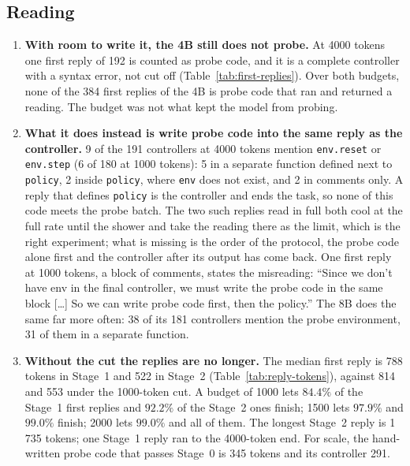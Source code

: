 \documentclass[11pt,a4paper]{article}
\begin{document}
\begin{table}[h]
\centering\small
\resizebox{\linewidth}{!}{}
\caption{By third of the limit's range, for the 4B at both budgets.}
\label{tab:budget-by-third}
\end{table}

\subsection{Reading}

\begin{enumerate}[leftmargin=1.5em]
  \item \textbf{With room to write it, the 4B still does not probe.} At 4000
  tokens one first reply of 192 is counted as probe code, and it is a complete
  controller with a syntax error, not cut off
  (Table~\ref{tab:first-replies}). Over both budgets, none of the 384 first
  replies of the 4B is probe code that ran and returned a reading. The budget
  was not what kept the model from probing.

  \item \textbf{What it does instead is write probe code into the same reply
  as the controller.} 9 of the 191 controllers at 4000 tokens mention
  \texttt{env.reset} or \texttt{env.step} (6 of 180 at 1000 tokens): 5 in a
  separate function defined next to \texttt{policy}, 2 inside
  \texttt{policy}, where \texttt{env} does not exist, and 2 in comments only.
  A reply that defines \texttt{policy} is the controller and ends the task,
  so none of this code meets the probe batch. The two such replies read in
  full both cool at the full rate until the shower and take the reading there
  as the limit, which is the right experiment; what is missing is the order
  of the protocol, the probe code alone first and the controller after its
  output has come back. One first reply at 1000 tokens, a block of comments,
  states the misreading: ``Since we don't have env in the final controller, we
  must write the probe code in the same block [\ldots] So we can write probe
  code first, then the policy.'' The 8B does the same far more often: 38 of
  its 181 controllers mention the probe environment, 31 of them in a separate
  function.

  \item \textbf{Without the cut the replies are no longer.} The median first
  reply is 788 tokens in Stage~1 and 522 in Stage~2
  (Table~\ref{tab:reply-tokens}), against 814 and 553 under the 1000-token
  cut. A budget of 1000 lets $84.4\%$ of the Stage~1 first replies and
  $92.2\%$ of the Stage~2 ones finish; 1500 lets $97.9\%$ and $99.0\%$
  finish; 2000 lets $99.0\%$ and all of them. The longest Stage~2 reply is
  1\,735 tokens; one Stage~1 reply ran to the 4000-token end. For scale, the
  hand-written probe code that passes Stage~0 is 345 tokens and its
  controller 291.


\end{enumerate}
\end{document}
